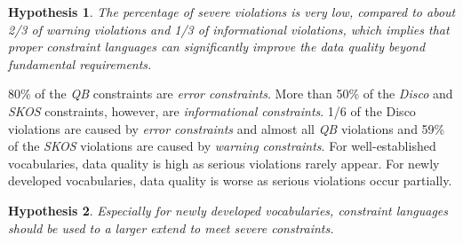 \documentclass{llncs}
\newtheorem{hyp}{Hypothesis}
\begin{document}
\begin{hyp}
The percentage of severe violations is very low, compared to about 2/3 of warning violations and 1/3 of informational violations, which implies that proper constraint languages can significantly improve the data quality beyond fundamental requirements.
\end{hyp} 

80\% of the \emph{QB} constraints are \emph{error constraints}.
More than 50\% of the \emph{Disco} and \emph{SKOS} constraints, however, are \emph{informational constraints}.
1/6 of the Disco violations are caused by \emph{error constraints} and
almost all \emph{QB} violations and 59\% of the \emph{SKOS} violations are caused by \emph{warning constraints}.  
For well-established vocabularies, data quality is high
as serious violations rarely appear.
For newly developed vocabularies, data quality is worse
as serious violations occur partially.
\begin{hyp}
Especially for newly developed vocabularies, constraint languages should be used to a larger extend to meet severe constraints.   
\end{hyp} 

\end{document}
